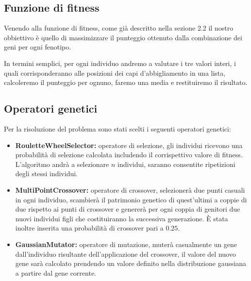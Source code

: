 \documentclass[a4paper, 11pt, oneside]{report}
\begin{document}
                \subsection{Funzione di fitness}
                \par \noindent Venendo alla funzione di fitness, come già descritto nella sezione 2.2 il
                nostro obbiettivo è quello di massimizzare il punteggio ottenuto dalla combinazione dei geni per ogni
                fenotipo.
                \par \noindent In termini semplici, per ogni individuo andremo a valutare i tre valori interi, i quali
                corrisponderanno alle posizioni dei capi d'abbigliamento in una lista, calcoleremo il punteggio per ognuno,
                faremo una media e restituiremo il risultato.

                \subsection{Operatori genetici}
                Per la risoluzione del problema sono stati scelti i seguenti operatori genetici:
                \begin{itemize}
                    \item \textbf{RouletteWheelSelector:} operatore di selezione, gli individui ricevono una probabilità
                    di selezione calcolata includendo il corrispettivo valore di fitness. L'algoritmo andrà a selezionare
                    $n$ individui, saranno consentite ripetizioni degli stessi individui.
                    \item \textbf{MultiPointCrossover:} operatore di crossover, selezionerà due punti casuali in ogni
                    individuo, scambierà il patrimonio genetico di quest'ultimi a coppie di due rispetto ai punti di
                    crossover e genererà per ogni coppia di genitori due nuovi individui figli che costituiranno la
                    successiva generazione. È stata inoltre inserita una probabilità di crossover pari a $0.25$.
                    \item \textbf{GaussianMutator:} operatore di mutazione, muterà casualmente un gene dall'individuo
                    risultante dell'applicazione del crossover, il valore del nuovo gene sarà calcolato prendendo un
                    valore definito nella distribuzione gaussiana a partire dal gene corrente.
                \end{itemize}
\end{document}
